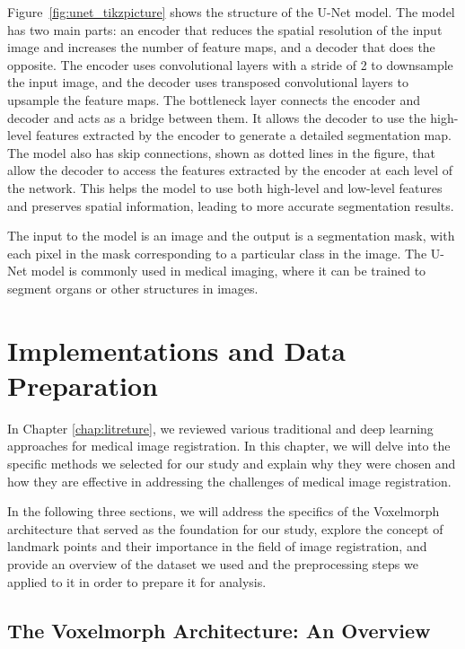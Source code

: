 \documentclass{report}
\begin{document}
	Figure~\ref{fig:unet_tikzpicture} shows the structure of the U-Net model. The model has two main parts: an encoder that reduces the spatial resolution of the input image and increases the number of feature maps, and a decoder that does the opposite. The encoder uses convolutional layers with a stride of 2 to downsample the input image, and the decoder uses transposed convolutional layers to upsample the feature maps. The bottleneck layer connects the encoder and decoder and acts as a bridge between them. It allows the decoder to use the high-level features extracted by the encoder to generate a detailed segmentation map. The model also has skip connections, shown as dotted lines in the figure, that allow the decoder to access the features extracted by the encoder at each level of the network. This helps the model to use both high-level and low-level features and preserves spatial information, leading to more accurate segmentation results.
	
	The input to the model is an image and the output is a segmentation mask, with each pixel in the mask corresponding to a particular class in the image. The U-Net model is commonly used in medical imaging, where it can be trained to segment organs or other structures in images.
	
	\chapter{Implementations and Data Preparation}
	In Chapter \ref{chap:litreture}, we reviewed various traditional and deep learning approaches for medical image registration. In this chapter, we will delve into the specific methods we selected for our study and explain why they were chosen and how they are effective in addressing the challenges of medical image registration.
	
	In the following three sections, we will address the specifics of the Voxelmorph architecture \cite{Balakrishnan_2019} that served as the foundation for our study, explore the concept of landmark points and their importance in the field of image registration, and provide an overview of the dataset we used and the preprocessing steps we applied to it in order to prepare it for analysis.
	
	\section{The Voxelmorph Architecture: An Overview}
	\label{sec:vxm_architecture}
	
\end{document}
